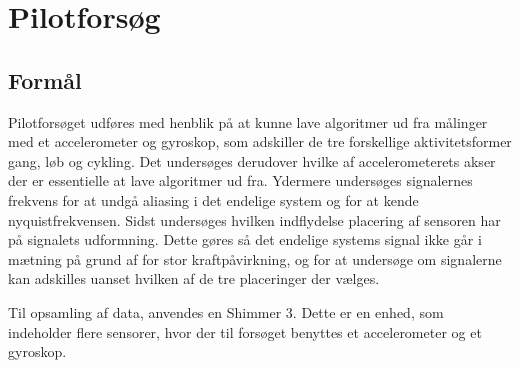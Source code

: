 \chapter{Pilotforsøg}\vspace{-.75cm}
\section{Formål}
Pilotforsøget udføres med henblik på at kunne lave algoritmer ud fra målinger med et accelerometer og gyroskop, som adskiller de tre forskellige aktivitetsformer gang, løb og cykling. Det undersøges derudover hvilke af accelerometerets akser der er essentielle at lave algoritmer ud fra. Ydermere undersøges signalernes frekvens for at undgå aliasing i det endelige system og for at kende nyquistfrekvensen. Sidst undersøges hvilken indflydelse placering af sensoren har på signalets udformning. Dette gøres så det endelige systems signal ikke går i mætning på grund af for stor kraftpåvirkning, og for at undersøge om signalerne kan adskilles uanset hvilken af de tre placeringer der vælges.

Til opsamling af data, anvendes en Shimmer 3. Dette er en enhed, som indeholder flere sensorer, hvor der til forsøget benyttes et accelerometer og et gyroskop. 



